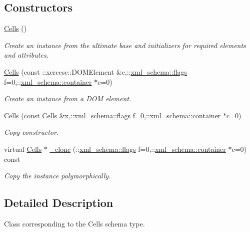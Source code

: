 \subsection*{Constructors}
\begin{DoxyCompactItemize}
\item 
\hyperlink{classCells_a092d62bc15648a54755a413dbf9a2db0}{Cells} ()
\begin{DoxyCompactList}\small\item\em Create an instance from the ultimate base and initializers for required elements and attributes. \end{DoxyCompactList}\item 
\hyperlink{classCells_a79e3031094d928c8d275198201d44f0c}{Cells} (const \+::xercesc\+::\+D\+O\+M\+Element \&e,\+::\hyperlink{namespacexml__schema_a8d981c127a1f5106d04ad5853e707361}{xml\+\_\+schema\+::flags} f=0,\+::\hyperlink{namespacexml__schema_a395f5179c5fc4643909d66e9ff28d8ca}{xml\+\_\+schema\+::container} $\ast$c=0)
\begin{DoxyCompactList}\small\item\em Create an instance from a D\+O\+M element. \end{DoxyCompactList}\item 
\hyperlink{classCells_a9322653263fb302eb7068be10b1b364f}{Cells} (const \hyperlink{classCells}{Cells} \&x,\+::\hyperlink{namespacexml__schema_a8d981c127a1f5106d04ad5853e707361}{xml\+\_\+schema\+::flags} f=0,\+::\hyperlink{namespacexml__schema_a395f5179c5fc4643909d66e9ff28d8ca}{xml\+\_\+schema\+::container} $\ast$c=0)
\begin{DoxyCompactList}\small\item\em Copy constructor. \end{DoxyCompactList}\item 
virtual \hyperlink{classCells}{Cells} $\ast$ \hyperlink{classCells_a67e7fa1cc404dcc4814011ca179f8a83}{\+\_\+clone} (\+::\hyperlink{namespacexml__schema_a8d981c127a1f5106d04ad5853e707361}{xml\+\_\+schema\+::flags} f=0,\+::\hyperlink{namespacexml__schema_a395f5179c5fc4643909d66e9ff28d8ca}{xml\+\_\+schema\+::container} $\ast$c=0) const 
\begin{DoxyCompactList}\small\item\em Copy the instance polymorphically. \end{DoxyCompactList}\end{DoxyCompactItemize}


\subsection{Detailed Description}
Class corresponding to the Cells schema type. 

